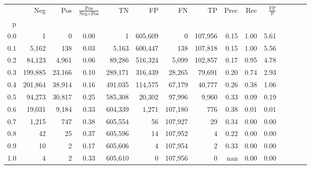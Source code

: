 \begin{tabular}{rrrcrrrrrrrrrrr}
\toprule
{} &      Neg &     Pos & $\frac{\text{Pos}}{\text{Neg}+\text{Pos}}$ &       TN &       FP &       FN &       TP &  Prec &   Rec & $\frac{\text{FP}}{\text{P}}$ \\
p   &          &         &                                            &          &          &          &          &       &       &                              \\
\midrule
0.0 &        1 &       0 &                                       0.00 &        1 &  605,609 &        0 &  107,956 &  0.15 &  1.00 &                         5.61 \\
0.1 &    5,162 &     138 &                                       0.03 &    5,163 &  600,447 &      138 &  107,818 &  0.15 &  1.00 &                         5.56 \\
0.2 &   84,123 &   4,961 &                                       0.06 &   89,286 &  516,324 &    5,099 &  102,857 &  0.17 &  0.95 &                         4.78 \\
0.3 &  199,885 &  23,166 &                                       0.10 &  289,171 &  316,439 &   28,265 &   79,691 &  0.20 &  0.74 &                         2.93 \\
0.4 &  201,864 &  38,914 &                                       0.16 &  491,035 &  114,575 &   67,179 &   40,777 &  0.26 &  0.38 &                         1.06 \\
0.5 &   94,273 &  30,817 &                                       0.25 &  585,308 &   20,302 &   97,996 &    9,960 &  0.33 &  0.09 &                         0.19 \\
0.6 &   19,031 &   9,184 &                                       0.33 &  604,339 &    1,271 &  107,180 &      776 &  0.38 &  0.01 &                         0.01 \\
0.7 &    1,215 &     747 &                                       0.38 &  605,554 &       56 &  107,927 &       29 &  0.34 &  0.00 &                         0.00 \\
0.8 &       42 &      25 &                                       0.37 &  605,596 &       14 &  107,952 &        4 &  0.22 &  0.00 &                         0.00 \\
0.9 &       10 &       2 &                                       0.17 &  605,606 &        4 &  107,954 &        2 &  0.33 &  0.00 &                         0.00 \\
1.0 &        4 &       2 &                                       0.33 &  605,610 &        0 &  107,956 &        0 &   nan &  0.00 &                         0.00 \\
\bottomrule
\end{tabular}
